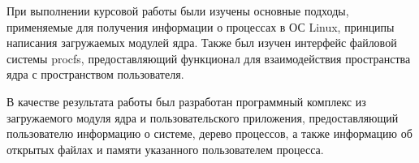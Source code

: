 \conclusion

При выполнении курсовой работы были изучены основные подходы, применяемые для получения информации о процессах в ОС Linux, принципы написания загружаемых модулей ядра. Также был изучен интерфейс файловой системы procfs, предоставляющий функционал для взаимодействия пространства ядра с пространством пользователя. 

В качестве результата работы был разработан программный комплекс из загружаемого модуля ядра и пользовательского приложения, предоставляющий пользователю информацию о системе, дерево процессов, а также информацию об открытых файлах и памяти указанного пользователем процесса.
